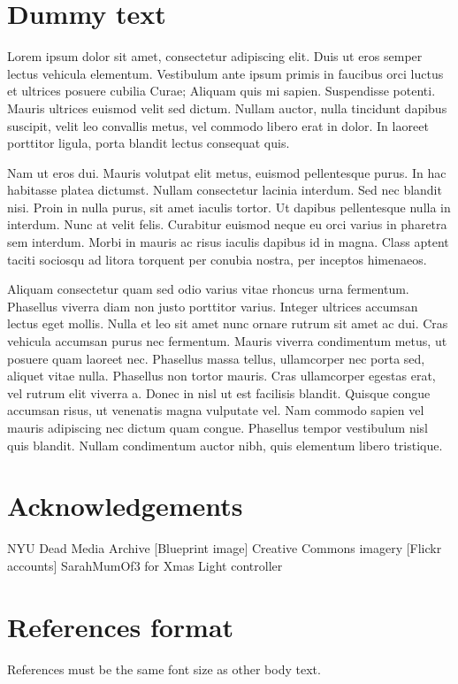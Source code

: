 \documentclass{chi-ext}
\begin{document}
\section{Dummy text}
Lorem ipsum dolor sit amet, consectetur adipiscing elit. Duis ut eros semper lectus vehicula elementum. Vestibulum ante ipsum primis in faucibus orci luctus et ultrices posuere cubilia Curae; Aliquam quis mi sapien. Suspendisse potenti. Mauris ultrices euismod velit sed dictum. Nullam auctor, nulla tincidunt dapibus suscipit, velit leo convallis metus, vel commodo libero erat in dolor. In laoreet porttitor ligula, porta blandit lectus consequat quis. 

Nam ut eros dui. Mauris volutpat elit metus, euismod pellentesque purus. In hac habitasse platea dictumst. Nullam consectetur lacinia interdum. Sed nec blandit nisi. Proin in nulla purus, sit amet iaculis tortor. Ut dapibus pellentesque nulla in interdum. Nunc at velit felis. Curabitur euismod neque eu orci varius in pharetra sem interdum. Morbi in mauris ac risus iaculis dapibus id in magna. Class aptent taciti sociosqu ad litora torquent per conubia nostra, per inceptos himenaeos.

Aliquam consectetur quam sed odio varius vitae rhoncus urna fermentum. Phasellus viverra diam non justo porttitor varius. Integer ultrices accumsan lectus eget mollis. Nulla et leo sit amet nunc ornare rutrum sit amet ac dui. Cras vehicula accumsan purus nec fermentum. Mauris viverra condimentum metus, ut posuere quam laoreet nec. Phasellus massa tellus, ullamcorper nec porta sed, aliquet vitae nulla. Phasellus non tortor mauris. Cras ullamcorper egestas erat, vel rutrum elit viverra a. Donec in nisl ut est facilisis blandit. Quisque congue accumsan risus, ut venenatis magna vulputate vel. Nam commodo sapien vel mauris adipiscing nec dictum quam congue. Phasellus tempor vestibulum nisl quis blandit. Nullam condimentum auctor nibh, quis elementum libero tristique.



\section{Acknowledgements}
NYU Dead Media Archive [Blueprint image]
Creative Commons imagery [Flickr accounts]
SarahMumOf3 for Xmas Light controller


\section{References format}
References must be the same font size as other body text.

\balance


\end{document}
